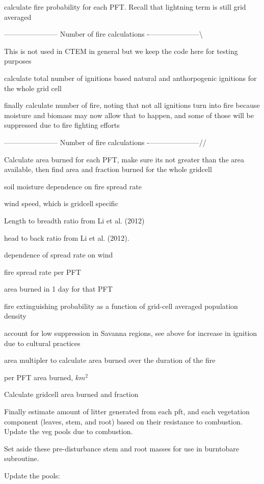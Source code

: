 calculate fire probability for each P\+F\+T. Recall that lightning term is still grid averaged

----------------------- Number of fire calculations -\/---------------------\textbackslash{}

This is not used in C\+T\+E\+M in general but we keep the code here for testing purposes

calculate total number of ignitions based natural and anthorpogenic ignitions for the whole grid cell

finally calculate number of fire, noting that not all ignitions turn into fire because moisture and biomass may now allow that to happen, and some of those will be suppressed due to fire fighting efforts

----------------------- Number of fire calculations -\/---------------------//

Calculate area burned for each P\+F\+T, make sure it\textquotesingle{}s not greater than the area available, then find area and fraction burned for the whole gridcell

soil moisture dependence on fire spread rate

wind speed, which is gridcell specific

Length to breadth ratio from Li et al. (2012)

head to back ratio from Li et al. (2012).

dependence of spread rate on wind

fire spread rate per P\+F\+T

area burned in 1 day for that P\+F\+T

fire extinguishing probability as a function of grid-\/cell averaged population density

account for low suppression in Savanna regions, see above for increase in ignition due to cultural practices

area multipler to calculate area burned over the duration of the fire

per P\+F\+T area burned, $km^2$

Calculate gridcell area burned and fraction

Finally estimate amount of litter generated from each pft, and each vegetation component (leaves, stem, and root) based on their resistance to combustion. Update the veg pools due to combustion.

Set aside these pre-\/disturbance stem and root masses for use in burntobare subroutine.

Update the pools\+:

